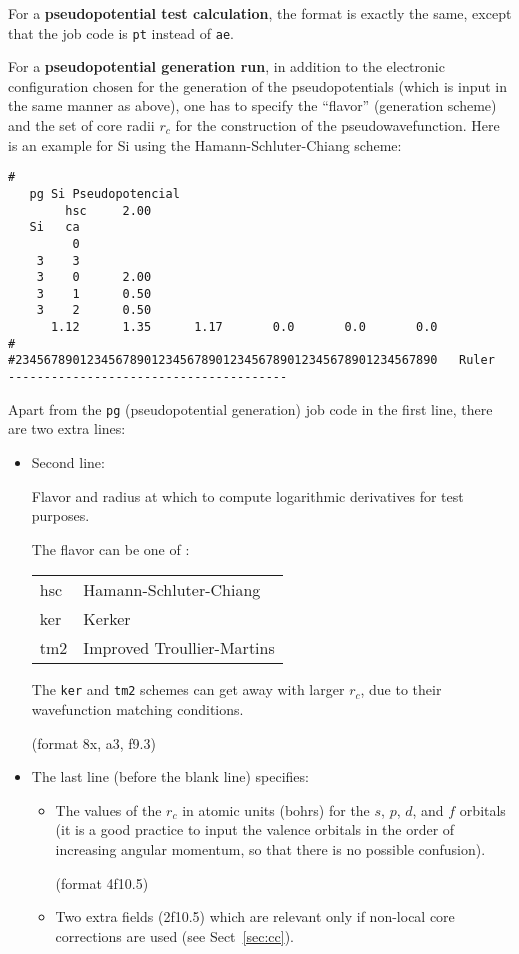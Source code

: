 \documentclass[11pt]{article}
\begin{document}
For a {\bf pseudopotential test calculation}, the format is exactly
the same, except that the job code is {\tt pt} instead of {\tt ae}. 


For a {\bf pseudopotential generation run}, in addition to the
electronic configuration chosen for the generation of the
pseudopotentials (which is input in the same manner as above), one has
to specify the ``flavor'' (generation scheme) and the set of core
radii $r_c$ for the construction of the pseudowavefunction. Here is an
example for Si using the Hamann-Schluter-Chiang scheme:

\begin{verbatim}
# 
   pg Si Pseudopotencial
        hsc     2.00
   Si   ca
         0
    3    3
    3    0      2.00
    3    1      0.50
    3    2      0.50
      1.12      1.35      1.17       0.0       0.0       0.0
#
#23456789012345678901234567890123456789012345678901234567890   Ruler
---------------------------------------
\end{verbatim}

Apart from the {\tt pg} (pseudopotential generation) job code in the
first line, there are two extra lines:

\begin{itemize}
\item Second line: 

Flavor and radius at which to compute logarithmic
derivatives for test purposes. 

The flavor can be one of :
\begin{tabular}{ll}
	hsc	&Hamann-Schluter-Chiang\\
	ker	&Kerker\\
	tm2	&Improved Troullier-Martins\\
\end{tabular}

The {\tt ker} and {\tt tm2} schemes can get away with larger $r_c$,
due to their wavefunction matching conditions.

(format 8x, a3, f9.3)

\item The last line (before the blank line) specifies:

\begin{itemize}
\item The values of the $r_c$ in atomic units (bohrs) for the $s$,
$p$, $d$, and $f$ orbitals (it is a good practice to input the valence
orbitals in the order of increasing angular momentum, so that there is
no possible confusion).

(format 4f10.5)  

\item Two extra fields (2f10.5) which are relevant only if non-local
core corrections are used (see Sect~\ref{sec:cc}).
\end{itemize}
\end{itemize}
\end{document}
